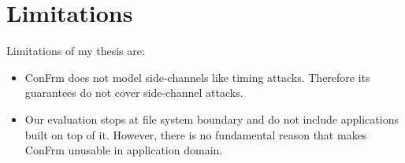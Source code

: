 \section{Limitations}
Limitations of my thesis are:
\begin{itemize}
	\item ConFrm does not model side-channels like timing attacks. Therefore its guarantees do not cover side-channel attacks.
	
	\item Our evaluation stops at file system boundary and do not include applications built on top of it. However, there is no fundamental reason that makes ConFrm unusable in application domain.
\end{itemize}